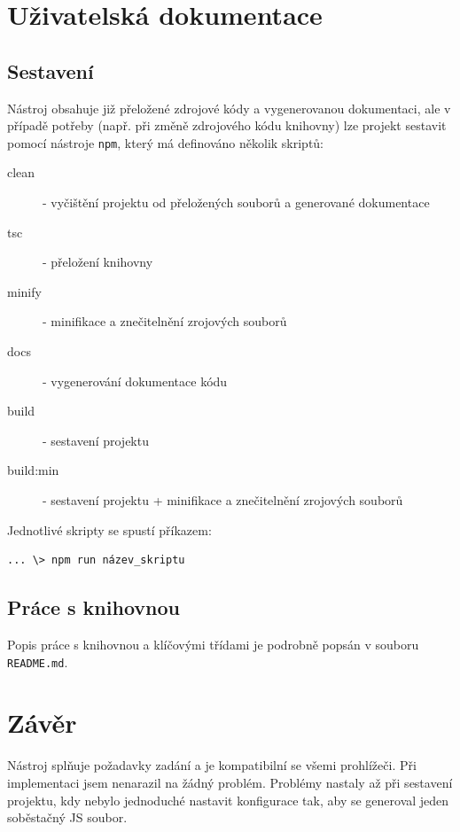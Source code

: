 \documentclass[
12pt,
a4paper,
pdftex,
czech,
titlepage
]{article}
\begin{document}
\section{Uživatelská dokumentace}

\subsection{Sestavení}

Nástroj obsahuje již přeložené zdrojové kódy a vygenerovanou dokumentaci, ale v případě potřeby (např. při změně zdrojového kódu knihovny) lze projekt sestavit pomocí nástroje \texttt{npm}, který má definováno několik skriptů:

\begin{description}
    \item[clean] - vyčištění projektu od přeložených souborů a generované dokumentace
    \item[tsc] - přeložení knihovny
    \item[minify] - minifikace a znečitelnění zrojových souborů
    \item[docs] - vygenerování dokumentace kódu
    \item[build] - sestavení projektu
    \item[build:min] - sestavení projektu + minifikace a znečitelnění zrojových souborů
\end{description}

\noindent Jednotlivé skripty se spustí příkazem:

\begin{verbatim}
... \> npm run název_skriptu
\end{verbatim}

\subsection{Práce s knihovnou}

Popis práce s knihovnou a klíčovými třídami je podrobně popsán v souboru \texttt{README.md}.

\section{Závěr}

Nástroj splňuje požadavky zadání a je kompatibilní se všemi prohlížeči. Při implementaci jsem nenarazil na žádný problém. Problémy nastaly až při sestavení projektu, kdy nebylo jednoduché nastavit konfigurace tak, aby se generoval jeden soběstačný JS soubor.
\end{document}
